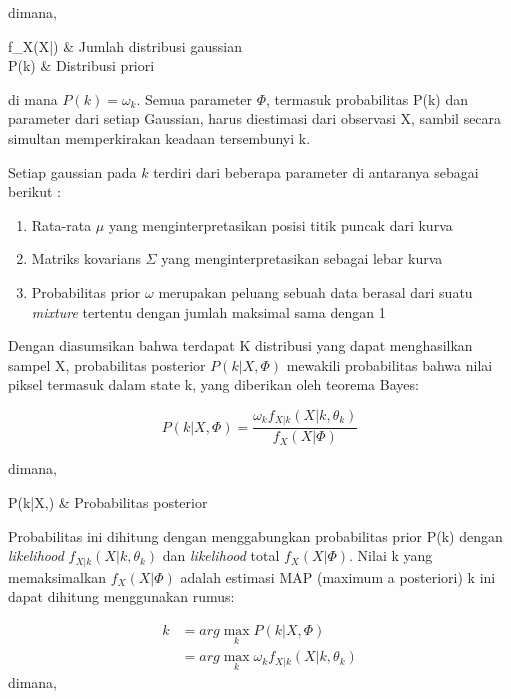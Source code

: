 dimana, 

\begin{conditions}
  f_X(X|\Phi) & Jumlah distribusi gaussian\\
  P(k) & Distribusi priori\\
\end{conditions}

di mana \(P(k) = \omega_k\). Semua parameter \(\Phi\), termasuk probabilitas P(k) dan parameter 
dari setiap Gaussian, harus diestimasi dari observasi X, sambil secara simultan 
memperkirakan keadaan tersembunyi k.

Setiap gaussian pada \(k\) terdiri dari beberapa parameter di antaranya sebagai berikut :

\begin{enumerate}
	\item Rata-rata \(\mu\) yang menginterpretasikan posisi titik puncak dari kurva
	\item Matriks kovarians \(\Sigma\) yang menginterpretasikan sebagai lebar kurva
	\item Probabilitas prior \(\omega\) merupakan peluang sebuah data berasal dari 
		suatu \emph{mixture} tertentu dengan jumlah maksimal sama dengan 1
\end{enumerate}

Dengan diasumsikan bahwa terdapat K distribusi yang dapat menghasilkan sampel X, 
probabilitas posterior \(P(k|X,\Phi)\) mewakili probabilitas bahwa nilai piksel termasuk 
dalam state k, yang diberikan oleh teorema Bayes: 

\begin{equation} \label{teorema_bayes}
	P(k|X,\Phi) = \frac{\omega_k f_{X|k} (X|k,\theta_k)}{f_X(X|\Phi)}
\end{equation}

dimana, 

\begin{conditions}
  P(k|X,\Phi) & Probabilitas posterior
\end{conditions}

Probabilitas ini dihitung dengan menggabungkan probabilitas prior P(k) dengan \emph{likelihood} 
\(f_{X|k}(X|k,\theta_k)\) dan \emph{likelihood} total \(f_X(X|\Phi)\). Nilai k yang memaksimalkan \(f_X(X|\Phi)\) 
adalah estimasi MAP (maximum a posteriori) k ini dapat dihitung menggunakan rumus:

\begin{equation} \label{maximum_posteriori}
  \begin{aligned}
    k & = arg \max_k P(k|X,\Phi) \\
      & = arg \max_k \omega_k f_{X|k} (X|k,\theta_k)
  \end{aligned}
\end{equation}
dimana, 

